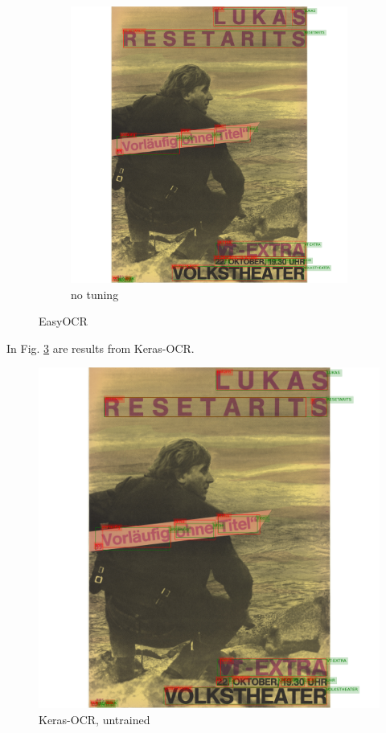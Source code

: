 \begin{figure}[hbtp!]
    \begin{subfigure}{\textwidth}
        \centering
        \includegraphics[scale=0.29]{obrazky/plakaty/result_easyOCR_vienna2_nosplit_notuning_nocorrection-83.png}
        \caption{no tuning}
        \label{Im3:ex:easy}
    \end{subfigure}
    \caption{EasyOCR}
    \label{Im3:ex:EasyOCR}
\end{figure}

In Fig. \ref{Im3:ex:keras} are results from Keras-OCR. 
\begin{figure}[hbtp!]
    \centering
   \includegraphics[scale=0.3]{obrazky/plakaty/result_kerasOCR_vienna2_nosplit-83.png}
    \caption{Keras-OCR, untrained}
    \label{Im3:ex:keras}
\end{figure}


